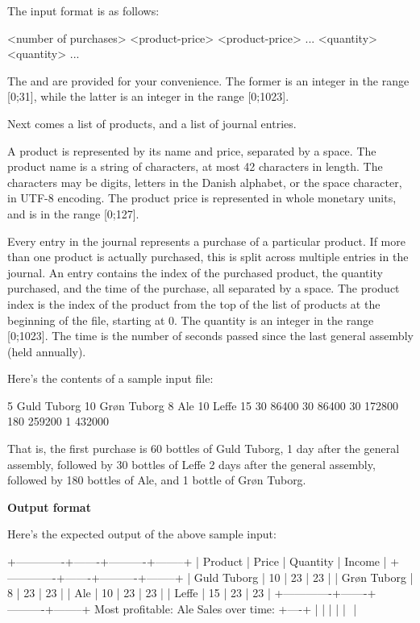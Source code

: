 The input format is as follows:

\begin{codebox}
 <number of purchases>
 <product-price>
 <product-price>
\zi ...
 <quantity>
 <quantity>
\zi ...
\end{codebox}

The  and  are provided
for your convenience. The former is an integer in the range [0;31], while the
latter is an integer in the range [0;1023].

Next comes a list of products, and a list of journal entries.

A product is represented by its name and price, separated by a space. The
product name is a string of characters, at most 42 characters in length. The
characters may be digits, letters in the Danish alphabet, or the space
character, in UTF-8 encoding. The product price is represented in whole
monetary units, and is in the range [0;127].

Every entry in the journal represents a purchase of a particular product. If
more than one product is actually purchased, this is split across multiple
entries in the journal. An entry contains the index of the purchased product,
the quantity purchased, and the time of the purchase, all separated by a space.
The product index is the index of the product from the top of the list of
products at the beginning of the file, starting at 0.  The quantity is an
integer in the range [0;1023]. The time is the number of seconds passed since
the last general assembly (held annually).

Here's the contents of a sample input file:

\begin{codebox}
 5
\li Guld Tuborg 10
\li Grøn Tuborg 8
\li Ale 10
\li Leffe 15
 30 86400
 30 86400
 30 172800
 180 259200
 1 432000
\end{codebox}

That is, the first purchase is 60 bottles of Guld Tuborg, 1 day after the
general assembly, followed by 30 bottles of Leffe 2 days after the general
assembly, followed by 180 bottles of Ale, and 1 bottle of Grøn Tuborg.

{\bf Output format}

Here's the expected output of the above sample input:

\begin{code}
+-------------+-------+----------+--------+
|   Product   | Price | Quantity | Income |
+-------------+-------+----------+--------+
| Guld Tuborg |    10 |       23 |     23 |
| Grøn Tuborg |     8 |       23 |     23 |
| Ale         |    10 |       23 |     23 |
| Leffe       |    15 |       23 |     23 |
+-------------+-------+----------+--------+
Most profitable: Ale
Sales over time:
+----+
|    |
|    |
| $$ |
\end{code}

